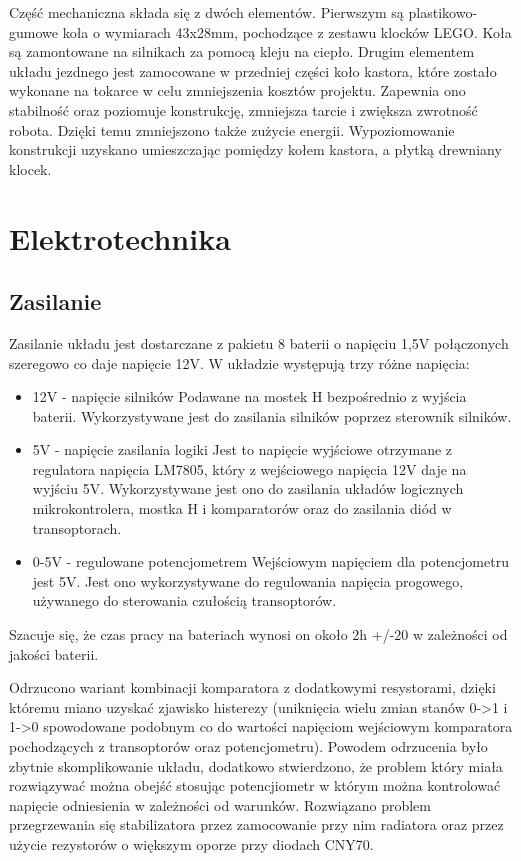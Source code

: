\documentclass[11pt,a4paper]{article}
\begin{document}
  Część mechaniczna składa się z dwóch elementów. Pierwszym są plastikowo-gumowe koła o wymiarach 43x28mm, pochodzące z zestawu klocków LEGO. Koła są zamontowane na silnikach za pomocą kleju na ciepło.
Drugim elementem układu jezdnego jest zamocowane w przedniej części koło kastora, które zostało wykonane na tokarce w celu zmniejszenia kosztów projektu. Zapewnia ono stabilność oraz poziomuje konstrukcję, zmniejsza tarcie i zwiększa zwrotność robota. Dzięki temu zmniejszono także zużycie energii. Wypoziomowanie konstrukcji uzyskano umieszczając pomiędzy kołem kastora, a płytką drewniany klocek.

\section{Elektrotechnika}
\subsection{Zasilanie}
Zasilanie układu jest dostarczane z pakietu 8 baterii o napięciu 1,5V połączonych szeregowo co daje napięcie 12V.
 W układzie występują trzy różne napięcia:
  \begin{itemize} 
  \item 12V - napięcie silników
  Podawane na mostek H bezpośrednio z wyjścia baterii.
  Wykorzystywane jest do zasilania silników poprzez sterownik silników.
  \item 5V - napięcie zasilania logiki
  Jest to napięcie wyjściowe otrzymane z regulatora napięcia LM7805, który z wejściowego napięcia 12V daje na wyjściu 5V.
  Wykorzystywane jest ono do zasilania układów logicznych mikrokontrolera, mostka H i komparatorów oraz do zasilania diód w transoptorach.
  \item 0-5V - regulowane potencjometrem
  Wejściowym napięciem dla potencjometru jest 5V. Jest ono wykorzystywane do regulowania napięcia progowego, używanego do sterowania czułością transoptorów.
  \end{itemize}
  Szacuje się, że czas pracy na bateriach wynosi on około 2h +/-20 w zależności od jakości baterii.

  Odrzucono wariant kombinacji komparatora z dodatkowymi resystorami, dzięki któremu miano uzyskać zjawisko histerezy (uniknięcia wielu zmian stanów 0->1 i 1->0 spowodowane podobnym co do wartości napięciom wejściowym komparatora pochodzących z transoptorów oraz potencjometru).
  Powodem odrzucenia było zbytnie skomplikowanie układu, dodatkowo stwierdzono, że problem który miała rozwiązywać można obejść stosując potencjiometr w którym można kontrolować napięcie odniesienia w zależności od warunków.
  Rozwiązano problem przegrzewania się stabilizatora przez zamocowanie przy nim radiatora oraz przez użycie rezystorów o większym oporze przy diodach CNY70.
\end{document}
